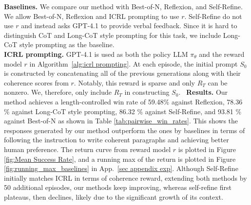 \documentclass{article}
\newcommand{\0}{\mathbf{0}}
\begin{document}
\textbf{Baselines.} We compare our method with Best-of-N, Reflexion, and Self-Refine.
We allow Best-of-N, Reflexion and ICRL prompting to use $r$.
Self-Refine do not use $r$ and instead asks GPT-4.1 to provide verbal feedback.
Since it is hard to distinguish CoT and Long-CoT style prompting for this task, we include Long-CoT style prompting as the baseline. \\
\textbf{ICRL prompting.} GPT-4.1 is used as both the policy LLM $\pi_\theta$ and the reward model $r$ in Algorithm~\ref{alg:icrl prompting}. At each episode, the initial prompt  $S_0$ is constructed by concatenating all of the previous generations along with their coherence scores from $r$.
Notably, this reward is sparse and only $R_T$ can be nonzero.
We, therefore, only include $R_T$ in constructing $S_0$.\hfil~
\textbf{Results.} Our method achieves a length-controlled win rate of 59.48\% against Reflexion, 78.36 \% against Long-CoT style prompting, 86.32 \% against Self-Refine, and 93.81 \% against Best-of-N as shown in Table \ref{tab:pairwise_win_rates}. This shows the responses generated by our method outperform the ones by baselines in terms of following the instruction to write coherent paragraphs and achieving better human preference.
The return curve from reward model $r$ is plotted in Figure \ref{fig:Mean Success Rate}, and a running max of the return is plotted in Figure \ref{fig:running_max_baselines} in App.~\ref{sec appendix exp}. Although Self-Refine initially matches ICRL in terms of coherence reward, extending both methods by 50 additional episodes, our methods keep improving, whereas self-refine first plateaus, then declines, likely due to the significant growth of its context.
\end{document}
